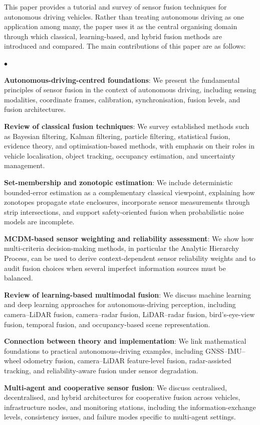 \documentclass{ieeeaccess}
\newenvironment{list4a}{
  \begin{list}{$\bullet$}{%
      \setlength{\itemsep}{0.05cm}
      \setlength{\labelsep}{0.2cm}
      \setlength{\labelwidth}{0.3cm}
      \setlength{\parsep}{0in}
      \setlength{\parskip}{0in}
      \setlength{\topsep}{0in}
      \setlength{\partopsep}{0in}
      \setlength{\leftmargin}{0.16in}}}
      {\end{list}}
\begin{document}
This paper provides a tutorial and survey of sensor fusion techniques for autonomous driving vehicles. Rather than treating autonomous driving as one application among many, the paper uses it as the central organising domain through which classical, learning-based, and hybrid fusion methods are introduced and compared. The main contributions of this paper are as follows:
\begin{list4a}
    \item \textbf{Autonomous-driving-centred foundations}: We present the fundamental principles of sensor fusion in the context of autonomous driving, including sensing modalities, coordinate frames, calibration, synchronisation, fusion levels, and fusion architectures.
    \item \textbf{Review of classical fusion techniques}: We survey established methods such as Bayesian filtering, Kalman filtering, particle filtering, statistical fusion, evidence theory, and optimisation-based methods, with emphasis on their roles in vehicle localisation, object tracking, occupancy estimation, and uncertainty management.
    \item \textbf{Set-membership and zonotopic estimation}: We include deterministic bounded-error estimation as a complementary classical viewpoint, explaining how zonotopes propagate state enclosures, incorporate sensor measurements through strip intersections, and support safety-oriented fusion when probabilistic noise models are incomplete.
    \item \textbf{MCDM-based sensor weighting and reliability assessment}: We show how multi-criteria decision-making methods, in particular the Analytic Hierarchy Process, can be used to derive context-dependent sensor reliability weights and to audit fusion choices when several imperfect information sources must be balanced.
    \item \textbf{Review of learning-based multimodal fusion}: We discuss machine learning and deep learning approaches for autonomous-driving perception, including camera--LiDAR fusion, camera--radar fusion, LiDAR--radar fusion, bird's-eye-view fusion, temporal fusion, and occupancy-based scene representation.
    \item \textbf{Connection between theory and implementation}: We link mathematical foundations to practical autonomous-driving examples, including GNSS--IMU--wheel odometry fusion, camera--LiDAR feature-level fusion, radar-assisted tracking, and reliability-aware fusion under sensor degradation.
    \item \textbf{Multi-agent and cooperative sensor fusion}: We discuss centralised, decentralised, and hybrid architectures for cooperative fusion across vehicles, infrastructure nodes, and monitoring stations, including the information-exchange levels, consistency issues, and failure modes specific to multi-agent settings.

\end{list4a}
\end{document}
